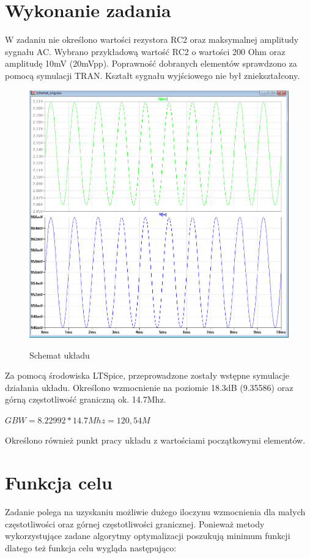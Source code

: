 \documentclass[10pt,a4paper]{article}
\begin{document}
\section{Wykonanie zadania}

W zadaniu nie określono wartości rezystora RC2 oraz maksymalnej amplitudy sygnału AC.
Wybrano przykładową wartość RC2 o wartości 200 Ohm oraz amplitudę 10mV (20mVpp).
Poprawność dobranych elementów sprawdzono za pomocą symulacji TRAN.
Kształt sygnału wyjściowego nie był zniekształcony.

\begin{figure}[H]
  \caption{Schemat układu}
  \centering
\includegraphics[scale=0.5]{obrazki/tran.png}
  \label{fig:schemat_tran}
\end{figure}

Za pomocą środowiska LTSpice, przeprowadzone zostały wstępne symulacje działania układu.
Określono wzmocnienie na poziomie 18.3dB (9.35586) oraz górną częstotliwość graniczną ok. 14.7Mhz.

$ GBW = 8.22992 * 14.7Mhz = 120,54M $


Określono również punkt pracy układu z wartościami początkowymi elementów.

\section{Funkcja celu}
Zadanie polega na uzyskaniu możliwie dużego iloczynu wzmocnienia dla małych częstotliwości oraz górnej częstotliwości granicznej.
Ponieważ metody wykorzystujące zadane algorytmy optymalizacji poszukują minimum funkcji dlatego też funkcja celu wygląda następująco:
\end{document}
